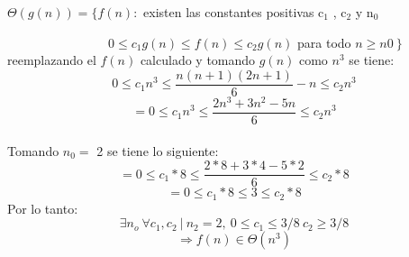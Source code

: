 \documentclass[11pt]{article}
\begin{document}
\( \Theta (g(n))  =  \{ f (n) :\) existen las constantes positivas c$_1$ , c$_2$ y n$_0$ 

\ \ \ \ \ \ \ \ \ \ \ \ \ \ \ \ \(0\leq  c_1 g (n) \leq f (n) \leq c_2 g (n)\) para todo \( n \geq n0 \ \}  \)\\

reemplazando el \(f(n)\) calculado y tomando \(g(n)\) como \(n^3\) se tiene:
\[0 \leq  c_1 n^3 \leq \frac{n(n+1)(2n+1)}{6} - n \leq c_2 n^3\]
\[= 0 \leq  c_1 n^3 \leq \frac{2n^3+3n^2-5n}{6} \leq c_2 n^3\]\\

Tomando \(n_0 = \) 2 se tiene lo siguiente:
\[= 0 \leq  c_1 * 8 \leq \frac{2*8+3*4-5*2}{6} \leq c_2 * 8\]
\[= 0 \leq  c_1 * 8 \leq 3 \leq c_2 * 8\]
Por lo tanto:
\[ \exists n_o\  \forall c_1,c_2 \ | \ n_2 = 2,\ 0 \leq c_1 \leq 3/8 \ c_2 \geq 3/8 \]
\[\Rightarrow f(n) \in \Theta(n^3)\]
\end{document}

